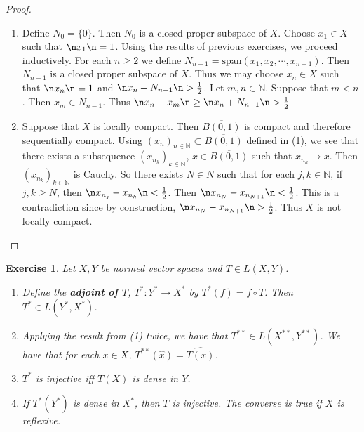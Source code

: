\documentclass[12pt]{amsart}
\newtheorem{ex}[thm]{Exercise}
\newcommand{\N}{\mathbb{N}}
\newcommand{\conv}[1]{\xrightarrow{#1}}
\begin{document}
\begin{proof}
	\begin{enumerate}
		\item Define $N_0 = \{0\}$. Then $N_0$ is a closed proper subspace of $X$. Choose $x_1 \in X$ such that $\n x_1 \n = 1$. Using the results of previous exercises, we proceed inductively. For each $n \geq 2$ we define $N_{n-1} = \text{span}(x_1, x_2, \cdots, x_{n-1})$. Then $N_{n-1}$ is a closed proper subspace of $X$. Thus we may choose $x_n \in X$ such that $\n x_n \n = 1$ and $\n x_n + N_{n-1} \n >  \frac{1}{2}$. Let $m,n \in \N$. Suppose that $m<n$. Then $x_m \in N_{n-1}$. Thus $\n x_n - x_m \n \geq \n x_n + N_{n-1} \n > \frac{1}{2}$\vspace{.5cm}\\
		\item Suppose that $X$ is locally compact. Then $\overline{B(0,1)}$ is compact and therefore sequentially compact. Using $(x_n)_{n \in \N} \subset \overline{B(0,1)}$ defined in (1), we see that there exists a subsequence $(x_{n_k})_{k \in \N}$, $x \in \overline{B(0,1)}$ such that $x_{n_k} \conv{} x$. Then $(x_{n_k})_{k \in \N}$ is Cauchy. So there exists $N \in N$ such that for each $j, k \in \N$, if $j, k \geq N$, then $\n x_{n_j} - x_{n_k} \n < \frac{1}{2}$. Then $\n x_{n_N} - x_{n_{N+1}} \n  < \frac{1}{2}$. This is a contradiction since by construction, $\n x_{n_N} - x_{n_{N+1}} \n  > \frac{1}{2}$. Thus $X$ is not locally compact.
	\end{enumerate}
\end{proof}

\begin{ex}
	Let $X,Y$ be normed vector spaces and $T \in L(X,Y)$. 
	\begin{enumerate}
		\item Define the \textbf{adjoint of $T$}, $T^*:Y^* \rightarrow X^*$ by $T^*(f) = f \circ T$. Then $T^* \in L(Y^*, X^*)$.
		\item Applying the result from (1) twice, we have that $T^{**} \in L(X^{**},Y^{**})$. We have that for each $x \in X$, $T^{**}(\hat{x}) = \widehat{T(x)}$.
		\item $T^*$ is injective iff $T(X)$ is dense in $Y$.
		\item If $T^*(Y^*)$ is dense in $X^*$, then $T$ is injective. The converse is true if $X$ is reflexive.
	\end{enumerate}
\end{ex}
\end{document}
